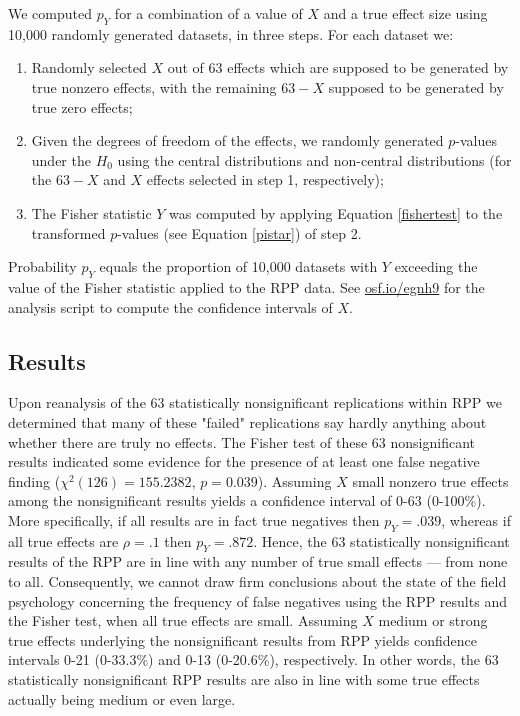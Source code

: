 \documentclass{article}
\begin{document}
We computed $p_Y$ for a combination of a value of $X$ and a true effect size using 10,000 randomly generated datasets, in three steps. For each dataset we: 
\begin{enumerate}
\item Randomly selected $X$ out of 63 effects which are supposed to be generated by true nonzero effects, with the remaining $63-X$ supposed to be generated by true zero effects;
\item Given the degrees of freedom of the effects, we randomly generated $p$-values under the $H_0$ using the central distributions and non-central distributions (for the $63-X$ and $X$ effects selected in step 1, respectively);
\item The Fisher statistic $Y$ was computed by applying Equation \ref{fishertest} to the transformed $p$-values (see Equation \ref{pistar}) of step 2. 
\end{enumerate}
Probability $p_Y$ equals the proportion of 10,000 datasets with $Y$ exceeding the value of the Fisher statistic applied to the RPP data. See \url{osf.io/egnh9} for the analysis script to compute the confidence intervals of $X$. 

\subsection*{Results}



Upon reanalysis of the 63 statistically nonsignificant replications within RPP we determined that many of these "failed" replications say hardly anything about whether there are truly no effects. The Fisher test of these 63 nonsignificant results indicated some evidence for the presence of at least one false negative finding ($\chi^2(126)=155.2382$, $p=0.039$). Assuming $X$ small nonzero true effects among the nonsignificant results yields a confidence interval of 0-63 (0-100\%). More specifically, if all results are in fact true negatives then $p_Y=.039$, whereas if all true effects are $\rho=.1$ then $p_Y=.872$. Hence, the 63 statistically nonsignificant results of the RPP are in line with any number of true small effects --- from none to all. Consequently, we cannot draw firm conclusions about the state of the field psychology concerning the frequency of false negatives using the RPP results and the Fisher test, when all true effects are small. Assuming $X$ medium or strong true effects underlying the nonsignificant results from RPP yields confidence intervals 0-21 (0-33.3\%) and 0-13 (0-20.6\%), respectively. In other words, the 63 statistically nonsignificant RPP results are also in line with some true effects actually being medium or even large.
\end{document}
